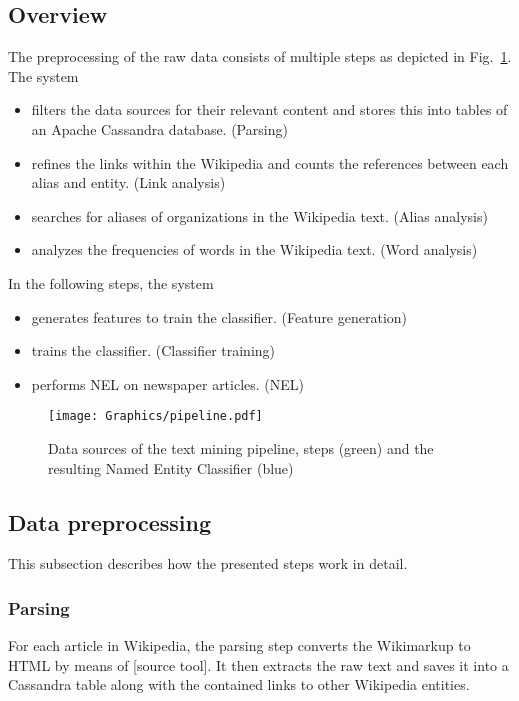 \subsection{Overview}
The preprocessing of the raw data consists of multiple steps as depicted in Fig.~\ref{fig:job_dependencies}. The system
\begin{itemize}
\item filters the data sources for their relevant content and stores this into tables of an Apache Cassandra database. (Parsing)
\item refines the links within the Wikipedia and counts the references between each alias and entity. (Link analysis)
\item searches for aliases of organizations in the Wikipedia text. (Alias analysis) 
\item analyzes the frequencies of words in the Wikipedia text. (Word analysis)
\end{itemize}

In the following steps, the system
\begin{itemize}
\item generates features to train the classifier. (Feature generation)
\item trains the classifier. (Classifier training)
\item performs NEL on newspaper articles. (NEL)
\end{itemize}

\begin{figure}[ht]
	\centering
  \texttt{[image: Graphics/pipeline.pdf]}
	\caption{Data sources of the text mining pipeline, steps (green) and the resulting Named Entity Classifier (blue)}
	\label{fig:job_dependencies}
\end{figure}


\subsection{Data preprocessing}
This subsection describes how the presented steps work in detail.

\subsubsection{Parsing}
For each article in Wikipedia, the parsing step converts the Wikimarkup to HTML by means of [source tool]. It then extracts the raw text and saves it into a Cassandra table along with the contained links to other Wikipedia entities.

